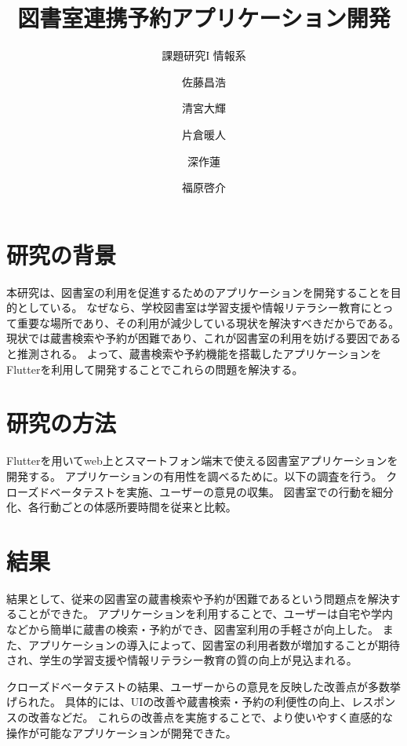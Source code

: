 \documentclass[pdflatex,ja=standard,twocolumn]{bxjsarticle}
\begin{document}
\title{図書室連携予約アプリケーション開発}
\author{課題研究I 情報系\and 佐藤昌浩 \and 清宮大輝 \and 片倉暖人 \and 深作蓮 \and 福原啓介}
\date{\vspace{-10mm}}


\section{研究の背景}
本研究は、図書室の利用を促進するためのアプリケーションを開発することを目的としている。
なぜなら、学校図書室は学習支援や情報リテラシー教育にとって重要な場所であり、その利用が減少している現状を解決すべきだからである。
現状では蔵書検索や予約が困難であり、これが図書室の利用を妨げる要因であると推測される。
よって、蔵書検索や予約機能を搭載したアプリケーションをFlutterを利用して開発することでこれらの問題を解決する。
\section{研究の方法}
Flutterを用いてweb上とスマートフォン端末で使える図書室アプリケーションを開発する。
アプリケーションの有用性を調べるために。以下の調査を行う。
クローズドベータテストを実施、ユーザーの意見の収集。
図書室での行動を細分化、各行動ごとの体感所要時間を従来と比較。
\newpage
\section{結果}
結果として、従来の図書室の蔵書検索や予約が困難であるという問題点を解決することができた。
アプリケーションを利用することで、ユーザーは自宅や学内などから簡単に蔵書の検索・予約ができ、図書室利用の手軽さが向上した。
また、アプリケーションの導入によって、図書室の利用者数が増加することが期待され、学生の学習支援や情報リテラシー教育の質の向上が見込まれる。

クローズドベータテストの結果、ユーザーからの意見を反映した改善点が多数挙げられた。
具体的には、UIの改善や蔵書検索・予約の利便性の向上、レスポンスの改善などだ。
これらの改善点を実施することで、より使いやすく直感的な操作が可能なアプリケーションが開発できた。
\end{document}
